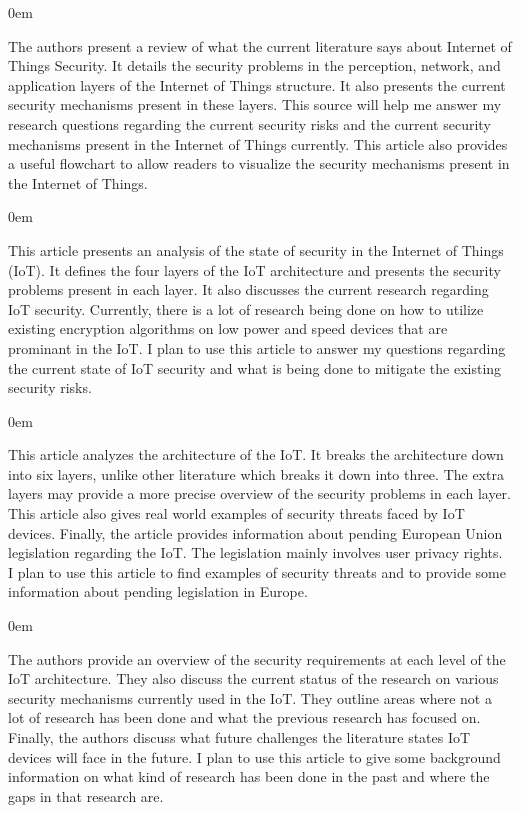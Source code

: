 \documentclass{article}
\newenvironment{annotation}{\begin{addmargin}[2.5em]{0em} \begin{flushleft}}{\end{flushleft} \end{addmargin}}
\begin{document}
\begin{annotation}
The authors present a review of what the current literature says about Internet of Things Security. 
It details the security problems in the perception, network, and application layers of the Internet of Things structure. 
It also presents the current security mechanisms present in these layers. 
This source will help me answer my research questions regarding the current security risks and the current security mechanisms present in the Internet of Things currently.
This article also provides a useful flowchart to allow readers to visualize the security mechanisms present in the Internet of Things.  
\end{annotation}

\begin{annotation}
This article presents an analysis of the state of security in the Internet of Things (IoT). It defines the four layers of the IoT architecture and presents the security
problems present in each layer. It also discusses the current research regarding IoT security. Currently, there is a lot of research being done on how to utilize existing
encryption algorithms on low power and speed devices that are prominant in the IoT. I plan to use this article to answer my questions regarding the current state of IoT
security and what is being done to mitigate the existing security risks. 
\end{annotation}

\begin{annotation}
This article analyzes the architecture of the IoT. It breaks the architecture down into six layers, unlike other literature which breaks it down into three. The extra layers may provide a more precise overview of the security problems in each layer. This article also gives real world examples of security threats faced by IoT devices. Finally, the article provides information about pending European Union legislation regarding the IoT. The legislation mainly involves user privacy rights. I plan to use this article to find examples of security threats and to provide some information about pending legislation in Europe. 
\end{annotation}

\begin{annotation}
The authors provide an overview of the security requirements at each level of the IoT architecture. They also discuss the current status of the research on various security mechanisms currently used
in the IoT. They outline areas where not a lot of research has been done and what the previous research has focused on. Finally, the authors discuss what future challenges the literature states
IoT devices will face in the future. I plan to use this article to give some background information on what kind of research has been done in the past and where the gaps in that research are. 
\end{annotation}
\end{document}
